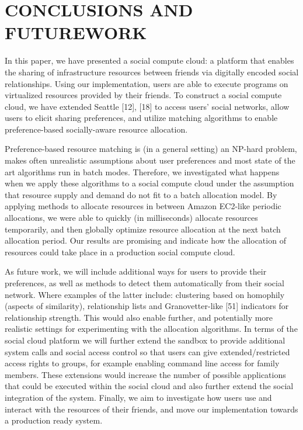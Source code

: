 \documentclass[a4paper,12pt]{article}
\begin{document}
	\section{CONCLUSIONS AND FUTUREWORK}
	In this paper, we have presented a social compute cloud: a
platform that enables the sharing of infrastructure resources
between friends via digitally encoded social relationships.
Using our implementation, users are able to execute programs on virtualized resources provided by their friends. To
construct a social compute cloud, we have extended Seattle
[12], [18] to access users’ social networks, allow users to elicit
sharing preferences, and utilize matching algorithms to
enable preference-based socially-aware resource allocation.
	\par Preference-based resource matching is (in a general setting) an NP-hard problem, makes often unrealistic assumptions about user preferences and most state of the art
algorithms run in batch modes. Therefore, we investigated
what happens when we apply these algorithms to a social
compute cloud under the assumption that resource supply
and demand do not fit to a batch allocation model. By
applying methods to allocate resources in between Amazon
EC2-like periodic allocations, we were able to quickly (in
milliseconds) allocate resources temporarily, and then globally optimize resource allocation at the next batch allocation
period. Our results are promising and indicate how the allocation of resources could take place in a production social
compute cloud.
	\par As future work, we will include additional ways for
users to provide their preferences, as well as methods to
detect them automatically from their social network. Where
examples of the latter include: clustering based on homophily (aspects of similarity), relationship lists and Granovetter-like [51] indicators for relationship strength. This would
also enable further, and potentially more realistic settings
for experimenting with the allocation algorithms. In terms
of the social cloud platform we will further extend the sandbox to provide additional system calls and social access control so that users can give extended/restricted access rights
to groups, for example enabling command line access for
family members. These extensions would increase the
number of possible applications that could be executed
within the social cloud and also further extend the social
integration of the system. Finally, we aim to investigate
how users use and interact with the resources of their
friends, and move our implementation towards a production ready system.
\end{document}
